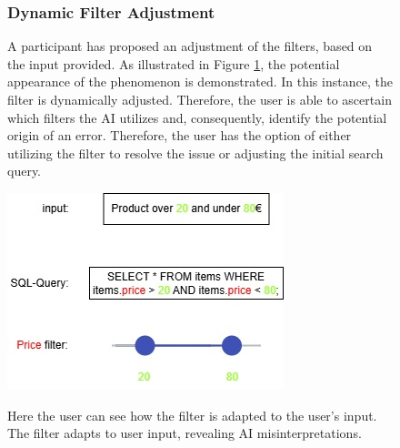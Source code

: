 \documentclass[../../submission.tex]{subfiles}
\begin{document}
 \begin{figure}[h]
     \centering
     \begin{minipage}{0.40\textwidth}
        \subsubsection{Dynamic Filter Adjustment}
        A participant has proposed an adjustment of the filters, based on the input provided. As illustrated in Figure \ref{fig:filter}, the potential appearance of the phenomenon is 
        demonstrated. In this instance, the filter is dynamically adjusted. Therefore, the user is able to ascertain 
        which filters the AI utilizes and, consequently, identify the potential origin of an error. Therefore, the user 
        has the option of either utilizing the filter to resolve the issue or adjusting the initial search query.       
     \end{minipage}
     \hfill
     \begin{minipage}{0.43\textwidth}
        \includegraphics[width=\textwidth]{images/filter}
        \caption{Here the user can see how the filter is adapted to the user's input. The filter adapts to user input, revealing AI misinterpretations.}
        \Description{}
        \label{fig:filter} 
    \end{minipage}
 \end{figure}
\end{document}
